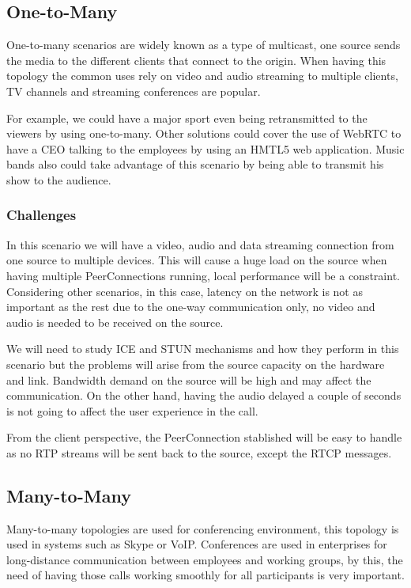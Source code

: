 \subsection{One-to-Many}

One-to-many scenarios are widely known as a type of multicast, one source sends the media to the different clients that connect to the origin. When having this topology the common uses rely on video and audio streaming to multiple clients, TV channels and streaming conferences are popular.

For example, we could have a major sport even being retransmitted to the viewers by using one-to-many. Other solutions could cover the use of WebRTC to have a CEO talking to the employees by using an HMTL5 web application. Music bands also could take advantage of this scenario by being able to transmit his show to the audience.

\subsubsection{Challenges}

In this scenario we will have a video, audio and data streaming connection from one source to multiple devices. This will cause a huge load on the source when having multiple PeerConnections running, local performance will be a constraint. Considering other scenarios, in this case, latency on the network is not as important as the rest due to the one-way communication only, no video and audio is needed to be received on the source.

We will need to study ICE and STUN mechanisms and how they perform in this scenario but the problems will arise from the source capacity on the hardware and link. Bandwidth demand on the source will be high and may affect the communication. On the other hand, having the audio delayed a couple of seconds is not going to affect the user experience in the call.

From the client perspective, the PeerConnection stablished will be easy to handle as no RTP streams will be sent back to the source, except the RTCP messages.

\subsection{Many-to-Many}

Many-to-many topologies are used for conferencing environment, this topology is used in systems such as Skype or VoIP. Conferences are used in enterprises for long-distance communication between employees and working groups, by this, the need of having those calls working smoothly for all participants is very important.

